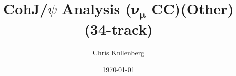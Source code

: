 \title{CohJ/$\psi$ Analysis ($\boldsymbol{\nu_\mu}$ \textbf{CC})(\textbf{Other})(\textbf{34-track})}
\author{Chris Kullenberg}
\date{\today}
